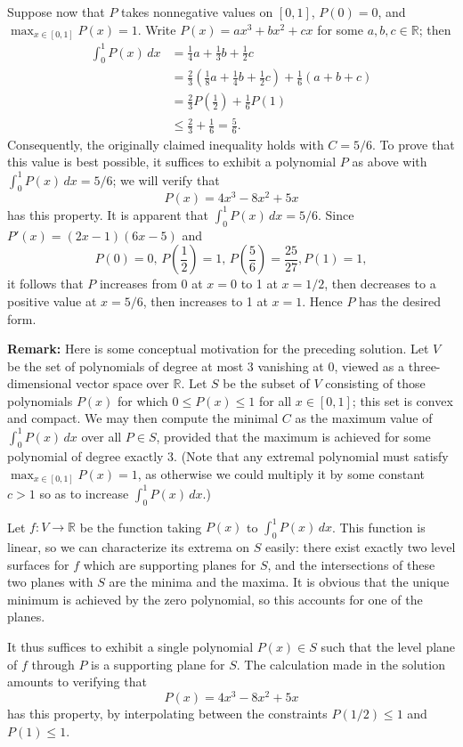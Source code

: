\documentclass[amssymb,twocolumn,pra,10pt,aps]{revtex4-1}
\newcommand{\RR}{\mathbb{R}}
\begin{document}
\begin{itemize}
Suppose now that $P$ takes nonnegative values on $[0,1]$, $P(0) = 0$, and $\max_{x \in [0,1]} P(x) = 1$. Write $P(x) = ax^3 + bx^2 + cx$ for some $a,b,c \in \RR$; then
\begin{align*}
\int_0^1 P(x)\,dx &= \frac{1}{4} a + \frac{1}{3} b + \frac{1}{2} c \\
&= \frac{2}{3} \left( \frac{1}{8} a + \frac{1}{4} b + \frac{1}{2} c \right)
+ \frac{1}{6} (a+b+c) \\
&= \frac{2}{3} P\left( \frac{1}{2} \right) + \frac{1}{6} P(1) \\
&\leq \frac{2}{3} + \frac{1}{6} = \frac{5}{6}.
\end{align*}
Consequently, the originally claimed inequality holds with $C = 5/6$. To prove that this value is best possible, it suffices to exhibit a polynomial $P$ as above with $\int_0^1 P(x)\,dx = 5/6$; we will verify that
\[
P(x) = 4x^3 - 8x^2 + 5x
\]
has this property. It is apparent that $\int_0^1 P(x)\, dx =5/6$.
Since $P'(x) = (2x-1)(6x-5)$ and 
\[
P(0) = 0, \,P\left( \frac{1}{2} \right) = 1, \,
P\left( \frac{5}{6} \right) = \frac{25}{27}, P(1) = 1,
\]
it follows that $P$ increases from 0 at $x=0$ to 1 at $x=1/2$, then decreases to a positive value at $x=5/6$, then increases to 1 at $x=1$. Hence $P$ has the desired form.

\noindent
\textbf{Remark:}
Here is some conceptual motivation for the preceding solution.
Let $V$ be the set of polynomials of degree at most 3 vanishing at 0, viewed as a three-dimensional vector space over $\RR$.
Let $S$ be the subset of $V$ consisting of those polynomials $P(x)$ for which
$0 \leq P(x) \leq 1$ for all $x \in [0,1]$; this set is convex and compact. We may then compute the minimal $C$ as the maximum value of $\int_0^1 P(x)\,dx$ over all $P \in S$, provided that the maximum is achieved for some polynomial of degree exactly 3. (Note that any extremal polynomial must satisfy
$\max_{x \in [0,1]} P(x) = 1$, as otherwise we could multiply it by some constant $c>1$ so as to increase $\int_0^1 P(x)\,dx$.)

Let $f: V \to \RR$ be the function taking $P(x)$ to $\int_0^1 P(x)\,dx$. This function is linear, so we can characterize its extrema on $S$ easily: there exist exactly two level surfaces for $f$ which are supporting planes for $S$, and the intersections of these two planes
with $S$ are the minima and the maxima. It is obvious that the unique minimum is achieved by the zero polynomial, so this accounts for one of the planes.

It thus suffices to exhibit a single polynomial $P(x) \in S$ such that the level plane of $f$ through $P$ is a supporting plane for $S$. 
The calculation made in the solution amounts to verifying that
\[
P(x) = 4x^3 - 8x^2 + 5x
\]
has this property, by interpolating between the constraints $P(1/2) \leq 1$ and $P(1) \leq 1$.


\end{itemize}
\end{document}
